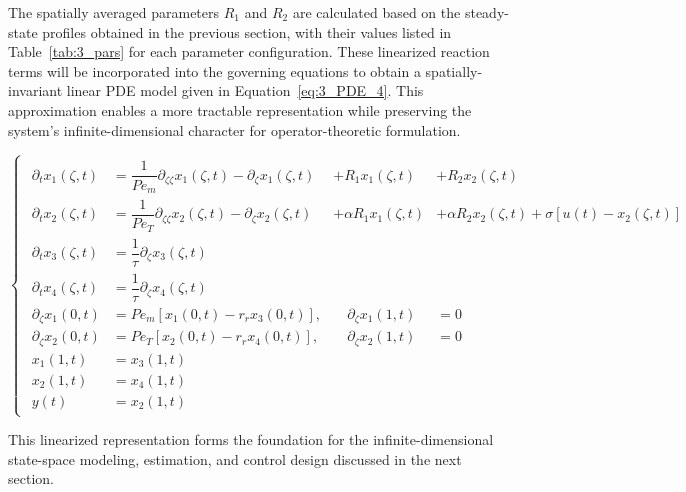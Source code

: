 The spatially averaged parameters $R_1$ and $R_2$ are calculated based on the steady-state profiles obtained in the previous section, with their values listed in Table~\ref{tab:3_pars} for each parameter configuration. These linearized reaction terms will be incorporated into the governing equations to obtain a spatially-invariant linear PDE model given in Equation~\eqref{eq:3_PDE_4}. This approximation enables a more tractable representation while preserving the system's infinite-dimensional character for operator-theoretic formulation.

\begin{equation} \label{eq:3_PDE_4}
\begin{cases}
\begin{alignedat}{3}
    \partial_{t} x_1(\zeta, t) &= \dfrac{1}{Pe_m} \partial_{\zeta\zeta} x_1(\zeta, t) 
    - \partial_{\zeta} x_1(\zeta, t) 
    &+ R_1 x_1(\zeta, t) &+ R_2 x_2(\zeta, t) \\[2.0ex]

    \partial_{t} x_2(\zeta, t) &= \dfrac{1}{Pe_T} \partial_{\zeta\zeta} x_2(\zeta, t) 
    - \partial_{\zeta} x_2(\zeta, t)
    &+ \alpha R_1 x_1(\zeta, t)  &+ \alpha R_2 x_2(\zeta, t) + \sigma \left[ u(t) - x_2(\zeta, t) \right] \\[2.0ex]

    \partial_{t} x_3(\zeta, t) &= \dfrac{1}{\tau} \partial_{\zeta} x_3(\zeta, t) 
    &\quad & \\[2.0ex]

    \partial_{t} x_4(\zeta, t) &= \dfrac{1}{\tau} \partial_{\zeta} x_4(\zeta, t) 
    &\quad & \\[3.0ex]

    \partial_\zeta x_1(0, t) &= Pe_m \left[ x_1(0, t) - r_r x_3(0, t) \right], 
    &\quad \partial_{\zeta} x_1(1, t) &= 0 \\[1.5ex]

    \partial_\zeta x_2(0, t) &= Pe_T \left[ x_2(0, t) - r_r x_4(0, t) \right], 
    &\quad \partial_{\zeta} x_2(1, t) &= 0 \\[1.5ex]

    x_1(1, t) &= x_3(1, t) \\[1.5ex]
    x_2(1, t) &= x_4(1, t) \\[1.5ex]
    y(t) &= x_2(1, t)
\end{alignedat}
\end{cases}
\end{equation}

This linearized representation forms the foundation for the infinite-dimensional state-space modeling, estimation, and control design discussed in the next section.